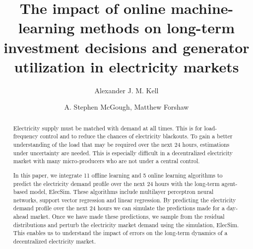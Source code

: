 \documentclass[final,3p,times,twocolumn,numbers]{elsarticle}
\begin{document}
\begin{frontmatter}


 \title{The impact of online machine-learning methods on long-term investment decisions and generator utilization in electricity markets}
 \author{Alexander J. M. Kell}



\author{A. Stephen McGough, Matthew Forshaw}

\address{School of Computing, Newcastle University, Newcastle upon Tyne, United Kingdom}

\begin{abstract}


Electricity supply must be matched with demand at all times. This is for load-frequency control and to reduce the chances of electricity blackouts. To gain a better understanding of the load that may be required over the next 24 hours, estimations under uncertainty are needed. This is especially difficult in a decentralized electricity market with many micro-producers who are not under a central control. 


In this paper, we integrate 11 offline learning and 5 online learning algorithms to predict the electricity demand profile over the next 24 hours with the long-term agent-based model, ElecSim. These algorithms include multilayer perceptron neural networks, support vector regression and linear regression. By predicting the electricity demand profile over the next 24 hours we can simulate the predictions made for a day-ahead market. Once we have made these predictions, we sample from the residual distributions and perturb the electricity market demand using the simulation, ElecSim. This enables us to understand the impact of errors on the long-term dynamics of a decentralized electricity market.
 


\end{abstract}
\end{frontmatter}
\end{document}
